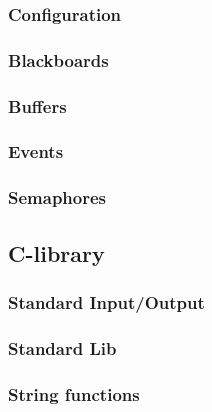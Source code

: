       \subsubsection{Configuration}

      \subsubsection{Blackboards}
      

      \subsubsection{Buffers}
      


      \subsubsection{Events}
      

      \subsubsection{Semaphores}
      

   \subsection{C-library}

      \subsubsection{Standard Input/Output}
      

      \subsubsection{Standard Lib}
      

      \subsubsection{String functions}
      

